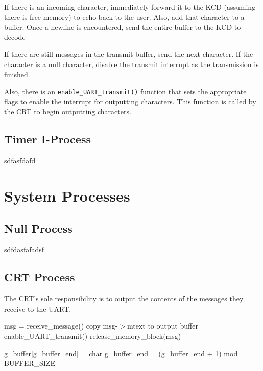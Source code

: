 \documentclass[12pt]{report}
\begin{document}
If there is an incoming character, immediately forward it to the KCD (assuming there is free memory) to echo back to the user. Also, add that character to a buffer. Once a newline is encountered, send the entire buffer to the KCD to decode

If there are still messages in the transmit buffer, send the next character. If the character is a null character, disable the transmit interrupt as the transmission is finished.


Also, there is an \texttt{enable_UART_transmit()} function that sets the appropriate flags to enable the interrupt for outputting characters. This function is called by the CRT to begin outputting characters.


\subsection{Timer I-Process}

sdfasfdafd


\section{System Processes}

\subsection{Null Process}

sdfdasfafadsf

\subsection{CRT Process}

The CRT's sole responsibility is to output the contents of the messages they receive to the UART.

\begin{algorithmic}[1]
      \State msg = receive\_message()
      \State copy msg-$>$mtext to output buffer
      \State enable\_UART\_transmit()
      \State release\_memory\_block(msg)
    \EndWhile
  \EndFunction
\end{algorithmic}

\begin{algorithmic}[1]
      \State g_buffer[g_buffer_end] = char
      \State g_buffer_end = (g_buffer_end + 1) mod BUFFER_SIZE
    \EndFor
  \EndFunction
\end{algorithmic}
\end{document}
